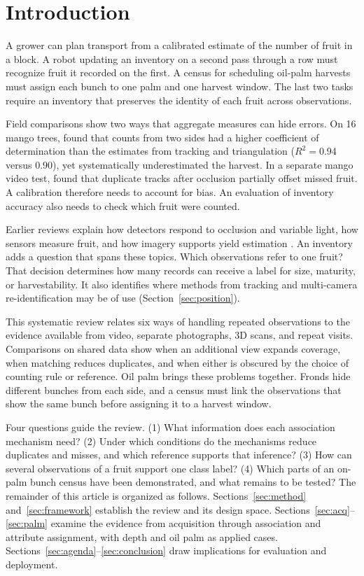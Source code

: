 \section{Introduction}\label{sec:intro}

A grower can plan transport from a calibrated estimate of the number of fruit in a block. A robot updating an inventory on a second pass through a row must recognize fruit it recorded on the first. A census for scheduling oil-palm harvests must assign each bunch to one palm and one harvest window. The last two tasks require an inventory that preserves the identity of each fruit across observations.

Field comparisons show two ways that aggregate measures can hide errors. On 16 mango trees, \citet{stein2016image} found that counts from two sides had a higher coefficient of determination than the estimates from tracking and triangulation ($R^2=0.94$ versus $0.90$), yet systematically underestimated the harvest. In a separate mango video test, \citet{wang2019mango} found that duplicate tracks after occlusion partially offset missed fruit. A calibration therefore needs to account for bias. An evaluation of inventory accuracy also needs to check which fruit were counted.

Earlier reviews explain how detectors respond to occlusion and variable light, how sensors measure fruit, and how imagery supports yield estimation \citep{gong2025fruit,trentin2024tree,fu2020application}. An inventory adds a question that spans these topics. Which observations refer to one fruit? That decision determines how many records can receive a label for size, maturity, or harvestability. It also identifies where methods from tracking and multi-camera re-identification may be of use (Section~\ref{sec:position}).

This systematic review relates six ways of handling repeated observations to the evidence available from video, separate photographs, 3D scans, and repeat visits. Comparisons on shared data show when an additional view expands coverage, when matching reduces duplicates, and when either is obscured by the choice of counting rule or reference. Oil palm brings these problems together. Fronds hide different bunches from each side, and a census must link the observations that show the same bunch before assigning it to a harvest window.

Four questions guide the review. (1) What information does each association mechanism need? (2) Under which conditions do the mechanisms reduce duplicates and misses, and which reference supports that inference? (3) How can several observations of a fruit support one class label? (4) Which parts of an on-palm bunch census have been demonstrated, and what remains to be tested? The remainder of this article is organized as follows. Sections~\ref{sec:method} and~\ref{sec:framework} establish the review and its design space. Sections~\ref{sec:acq}--\ref{sec:palm} examine the evidence from acquisition through association and attribute assignment, with depth and oil palm as applied cases. Sections~\ref{sec:agenda}--\ref{sec:conclusion} draw implications for evaluation and deployment.

